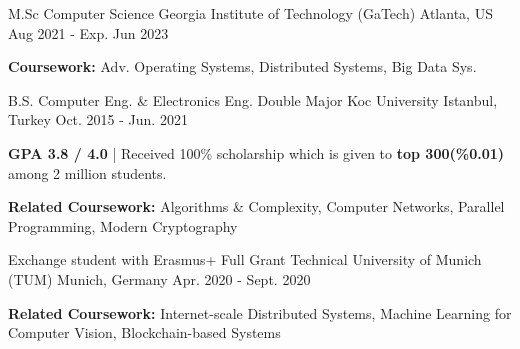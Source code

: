 \begin{cventries}

\cvopenentry
    {M.Sc Computer Science } %
    {Georgia Institute of Technology (GaTech)} %
    {Atlanta, US} %
    {Aug 2021 - Exp. Jun 2023} %
    {\begin{cvghostitems} %
        \item {\textbf{Coursework:} Adv. Operating Systems, Distributed Systems, Big Data Sys. }
      \end{cvghostitems}
    }
\cvopenentry
    {B.S. Computer Eng. \& Electronics Eng. Double Major} %
    {Koc University } %
    {Istanbul, Turkey} %
    {Oct. 2015 - Jun. 2021} %
    {
      \begin{cvitems} %
        \item {\textbf{GPA 3.8 / 4.0} | Received 100\% scholarship which is given to \textbf{top 300(\%0.01)} among 2 million students.}
        \item {\textbf{Related Coursework:} Algorithms \& Complexity, Computer Networks, Parallel Programming, Modern Cryptography}
      \end{cvitems}
    }
\cvopenentry
    {Exchange student with Erasmus+ Full Grant }
    {Technical University of Munich (TUM)} %
    {Munich, Germany} %
    {Apr. 2020 - Sept. 2020} %
    {\begin{cvitems} %
        \item {\textbf{Related Coursework:} Internet-scale Distributed Systems, Machine Learning for Computer Vision, Blockchain-based Systems}

\end{cvitems}}
\end{cventries}
